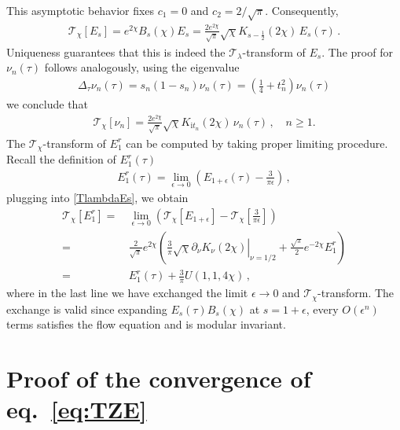 \documentclass[aps,twocolumn,prl,showpacs,amsmath,amssymb,10pt]{revtex4-2}
\begin{document}
This asymptotic behavior fixes $c_1=0$ and $c_2=2/\sqrt{\pi}$. Consequently,
\begin{align}\label{TlambdaEs}
\mathcal{T}_{\chi}[E_s]=e^{2\chi}B_s(\chi)E_s=\frac{2e^{2\chi}}{\sqrt{\pi}}\sqrt{\chi}K_{s-\frac{1}{2}}(2\chi)\,E_s(\tau)\,.
\end{align}
Uniqueness guarantees that this is indeed the $\mathcal{T}_{\lambda}$-transform of $E_s$. The proof for $\nu_n(\tau)$ follows analogously, using the eigenvalue
\begin{align}
\Delta_{\tau}\nu_n(\tau)=s_n(1-s_n)\nu_n(\tau)=(\tfrac{1}{4}+t_n^2)\nu_n(\tau)
\end{align}
we conclude that
\begin{align}
\mathcal{T}_{\chi}[\nu_n]=\frac{2e^{2\chi}}{\sqrt{\pi}}\sqrt{\chi}K_{\mathrm{i}t_n}(2\chi)\,\nu_n(\tau)\,,\quad n\geq 1.
\end{align}
The $\mathcal{T}_{\chi}$-transform of $E^r_1$ can be computed by taking proper limiting procedure.
Recall the definition of $E^r_1(\tau)$
\begin{align}
E^r_1(\tau)=\lim_{\epsilon\to 0}\left(E_{1+\epsilon}(\tau)-\frac{3}{\pi\epsilon}\right)\,,
\end{align}
plugging into \eqref{TlambdaEs}, we obtain
\begin{align}
\mathcal{T}_{\chi}[E^r_1]=&\,\lim_{\epsilon\to 0}\left(\mathcal{T}_{\chi}[E_{1+\epsilon}]-\mathcal{T}_{\chi}\left[\frac{3}{\pi\epsilon}\right]\right)\\\nonumber
=&\,\frac{2}{\sqrt{\pi}}e^{2\chi}\left(\frac{3}{\pi}\left.\sqrt{\chi}\partial_{\nu}K_{\nu}(2\chi)\right|_{\nu=1/2}+\frac{\sqrt{\pi}}{2}e^{-2\chi}E^r_1\right)\\\nonumber
=&\,E_1^r(\tau)+\frac{3}{\pi}U(1,1,4\chi)\,,
\end{align}
where in the last line we have exchanged the limit $\epsilon\to 0$ and $\mathcal{T}_{\chi}$-transform. The exchange is valid since expanding $E_s(\tau)B_s(\chi)$ at $s=1+\epsilon$, every $O(\epsilon^n)$ terms satisfies the flow equation and is modular invariant.



\section{Proof of the convergence of eq.~\eqref{eq:TZE}}
\end{document}
